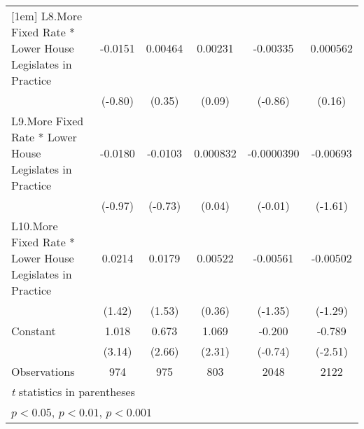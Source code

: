 {\begin{tabular}{l*{5}{c}}
[1em]
L8.More Fixed Rate * Lower House Legislates in Practice&  -0.0151         &  0.00464         &  0.00231         & -0.00335         & 0.000562         \\
                &  (-0.80)         &   (0.35)         &   (0.09)         &  (-0.86)         &   (0.16)         \\
[1em]
L9.More Fixed Rate * Lower House Legislates in Practice&  -0.0180         &  -0.0103         & 0.000832         &-0.0000390         & -0.00693         \\
                &  (-0.97)         &  (-0.73)         &   (0.04)         &  (-0.01)         &  (-1.61)         \\
[1em]
L10.More Fixed Rate * Lower House Legislates in Practice&   0.0214         &   0.0179         &  0.00522         & -0.00561         & -0.00502         \\
                &   (1.42)         &   (1.53)         &   (0.36)         &  (-1.35)         &  (-1.29)         \\
[1em]
Constant        &    1.018\sym{**} &    0.673\sym{**} &    1.069\sym{*}  &   -0.200         &   -0.789\sym{*}  \\
                &   (3.14)         &   (2.66)         &   (2.31)         &  (-0.74)         &  (-2.51)         \\
\hline
Observations    &      974         &      975         &      803         &     2048         &     2122         \\
\hline\hline
\multicolumn{6}{l}{\footnotesize \textit{t} statistics in parentheses}\\
\multicolumn{6}{l}{\footnotesize \sym{*} \(p<0.05\), \sym{**} \(p<0.01\), \sym{***} \(p<0.001\)}\\
\end{tabular}
}
